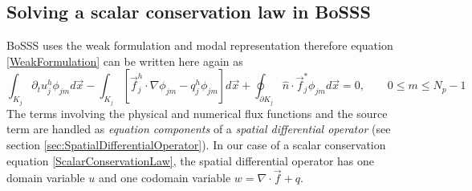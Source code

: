 \documentclass[BoSSSForSolvingConservationLaws.tex]{subfiles}
\begin{document}
\subsection{Solving a scalar conservation law in BoSSS}
BoSSS uses the weak formulation and modal representation therefore equation \eqref{WeakFormulation} can be written here again as
\begin{equation}
\label{WeakFormulation-BoSSSStyle}
\int_{K_j} \partial_t u_j^h \phi_{jm} d\vec{x}
-\int_{K_j}[\vec{f}_j^h\cdot \nabla \phi_{jm} -q_j^h \phi_{jm}] d\vec{x}
+\oint_{\partial K_j} \hat{n}\cdot \vec{f}_j^* \phi_{jm} d\vec{x}=0, \qquad 0\leq m \leq N_p-1
\end{equation}
The terms involving the physical and numerical flux functions and the source term are handled as \emph{equation components} of a \emph{spatial differential operator} (see section \ref{sec:SpatialDifferentialOperator}). In our case of a scalar conservation equation \eqref{ScalarConservationLaw}, the spatial differential operator has one domain variable $u$ and one codomain variable $w=\nabla\cdot \vec{f}+q$.
\end{document}
